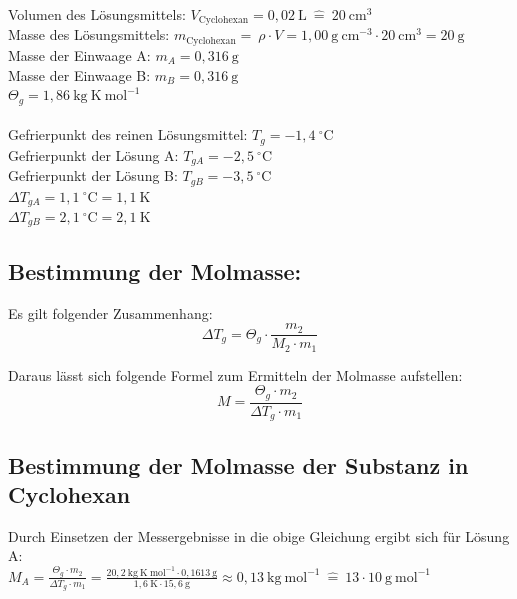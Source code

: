 \documentclass[12pt,a4paper,titlepage,headinclude,bibtotoc]{scrartcl}
\begin{document}
Volumen des Lösungsmittels: $V_{\mathrm{Cyclohexan}} = 0,02 {~} \mathrm{L}{~}\widehat{=}{~}20 {~}\mathrm{cm^3}$ \\
Masse des Lösungsmittels:  $m_{\mathrm{Cyclohexan}} = {~} \rho \cdot V = 1,00{~} \mathrm{g {~}cm^{-3}} \cdot 20{~} \mathrm{cm^{3}} = 20{~}\mathrm{g}$\\
Masse der Einwaage A: $m_A = 0,316{~} \mathrm{g}$\\ 
Masse der Einwaage B: $m_B = 0,316{~} \mathrm{g}$\\
$\Theta _g = 1,86 {~}\mathrm{kg{~}K {~} mol^{-1}}$\\\\
Gefrierpunkt des reinen Lösungsmittel: $ T_g = -1,4 {~}^{\circ}\text{C}$\\
Gefrierpunkt der Lösung A: $ T_{gA} = -2,5 {~}^{\circ}\text{C}$\\
Gefrierpunkt der Lösung B: $ T_{gB} = -3,5 {~}^{\circ}\text{C}$\\
$ \Delta T _{gA} =  1,1 {~}^{\circ}\text{C} = 1,1 {~}\mathrm{K} $\\
$ \Delta T _{gB} = 2,1 {~}^{\circ}\text{C} = 2,1{~} \mathrm{K} $

\subsection{Bestimmung der Molmasse:}

Es gilt folgender Zusammenhang:
\begin{equation}
\Delta T_g = \Theta _g \cdot \frac{m_2}{M_2 \cdot m_1}
\end{equation}

Daraus lässt sich folgende Formel zum Ermitteln der Molmasse aufstellen:
\begin{equation}
 M = \frac{\Theta _g \cdot m_2 }{ \Delta T_g\cdot m_1}
\end{equation}

\subsection{ Bestimmung der Molmasse der Substanz in Cyclohexan}

Durch Einsetzen der Messergebnisse in die obige Gleichung ergibt sich für Lösung A:\\

$M_A = \frac {\Theta _g \cdot m_2 }{ \Delta T_g\cdot m_1} 
 = \frac {20,2{~} \mathrm{kg{~}K {~} mol^{-1}} \cdot 0,1613 {~}\text{g}} { 1,6 {~} \mathrm{K} \cdot 15,6{~} \mathrm{g}} \approx 0,13{~} \mathrm{kg {~} mol^{-1}} {~}\widehat{=}{~} 13 \cdot 10{~} \mathrm{g{~}mol^{-1}} $\\
\end{document}
